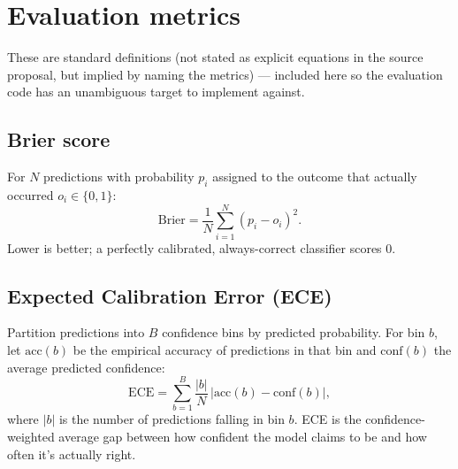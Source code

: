 \documentclass[11pt]{article}
\begin{document}
\section{Evaluation metrics}

These are standard definitions (not stated as explicit equations in the
source proposal, but implied by naming the metrics) --- included here so
the evaluation code has an unambiguous target to implement against.

\subsection{Brier score}
For $N$ predictions with probability $p_i$ assigned to the outcome that
actually occurred $o_i \in \{0,1\}$:
\begin{equation}
\text{Brier} = \frac{1}{N} \sum_{i=1}^{N} (p_i - o_i)^2.
\end{equation}
Lower is better; a perfectly calibrated, always-correct classifier
scores 0.

\subsection{Expected Calibration Error (ECE)}
Partition predictions into $B$ confidence bins by predicted probability.
For bin $b$, let $\text{acc}(b)$ be the empirical accuracy of predictions
in that bin and $\text{conf}(b)$ the average predicted confidence:
\begin{equation}
\text{ECE} = \sum_{b=1}^{B} \frac{|b|}{N} \, \big|\text{acc}(b) - \text{conf}(b)\big|,
\end{equation}
where $|b|$ is the number of predictions falling in bin $b$. ECE is the
confidence-weighted average gap between how confident the model claims
to be and how often it's actually right.
\end{document}
